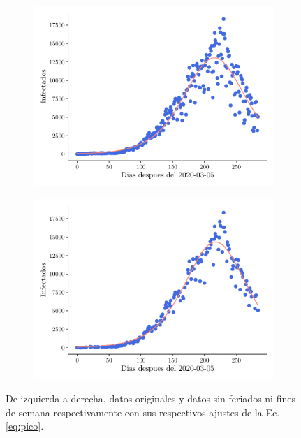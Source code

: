\documentclass[twocolumn,aps,prl]{revtex4-1}
\begin{document}
\begin{figure}[ht!]
  \centering
  \begin{subfigure}[b]{0.49\linewidth}
      \centering
      \includegraphics[width = 1.05\textwidth]{figuras/ex02-fit.pdf}
      \caption{}
      \label{fig:ex02-fit}
  \end{subfigure}\quad
  \begin{subfigure}[b]{0.49\linewidth}
      \centering
      \includegraphics[width = 1.05\textwidth]{figuras/ex02-fit-sin-Finde.pdf}
      \caption{}
      \label{fig:ex02-fit-sin-Finde}
  \end{subfigure}
  \caption{De izquierda a derecha, datos originales y datos sin feriados ni fines de semana respectivamente con sus respectivos ajustes de la Ec. \ref{eq:pico}.}
  \label{fig:ex02-fit-ambas}
\end{figure}
\end{document}
